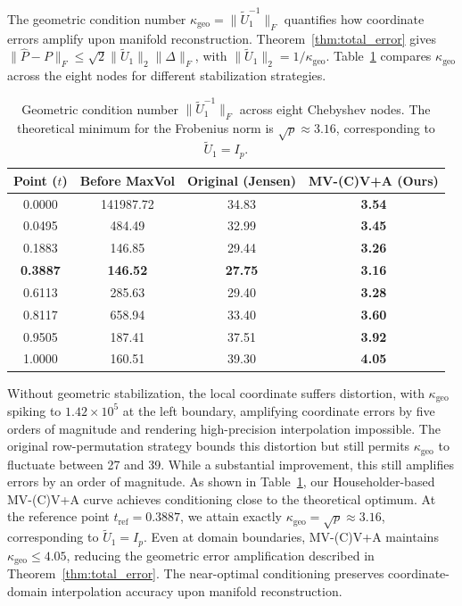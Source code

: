 \documentclass[11pt]{article}
\begin{document}
The geometric condition number $\kappa_{\text{geo}} = \|\widetilde U_1^{-1}\|_F$ quantifies how coordinate errors amplify upon manifold reconstruction. Theorem~\ref{thm:total_error} gives $\|\hat P - P\|_F \leq \sqrt{2} \|\widetilde U_1\|_2 \|\Delta\|_F$, with $\|\widetilde U_1\|_2 = 1/\kappa_{\text{geo}}$. Table~\ref{tab:geom_cond} compares $\kappa_{\text{geo}}$ across the eight nodes for different stabilization strategies.

\begin{table}[htbp]
\centering
\caption{Geometric condition number $\|\widetilde U_1^{-1}\|_F$ across eight Chebyshev nodes. The theoretical minimum for the Frobenius norm is $\sqrt{p} \approx 3.16$, corresponding to $\widetilde U_1 = I_p$.}
\label{tab:geom_cond}
\begin{tabular}{c|c|c|c}
\hline
\textbf{Point ($t$)} & \textbf{Before MaxVol} & \textbf{Original (Jensen)} & \textbf{ MV-(C)V+A (Ours)} \\
\hline
0.0000 & 141987.72 & 34.83 & \textbf{3.54} \\
0.0495 & 484.49 & 32.99 & \textbf{3.45} \\
0.1883 & 146.85 & 29.44 & \textbf{3.26} \\
{\bf 0.3887} & {\bf 146.52} & {\bf27.75} & \textbf{3.16} \\
0.6113 & 285.63 & 29.40 & \textbf{3.28} \\
0.8117 & 658.94 & 33.40 & \textbf{3.60} \\
0.9505 & 187.41 & 37.51 & \textbf{3.92} \\
1.0000 & 160.51 & 39.30 & \textbf{4.05} \\
\hline
\end{tabular}
\end{table}

Without geometric stabilization, the local coordinate suffers distortion, with $\kappa_{\text{geo}}$ spiking to $1.42\times10^5$ at the left boundary, amplifying coordinate errors by five orders of magnitude and rendering high-precision interpolation impossible.
The original row-permutation strategy bounds this distortion but still permits $\kappa_{\text{geo}}$ to fluctuate between 27 and 39. While a substantial improvement, this still amplifies errors by an order of magnitude.
As shown in Table~\ref{tab:geom_cond}, our Householder-based MV-(C)V+A curve achieves conditioning close to the theoretical optimum. At the reference point $t_{\text{ref}}=0.3887$, we attain exactly $\kappa_{\text{geo}} = \sqrt{p} \approx 3.16$, corresponding to $\widetilde U_1 = I_p$. Even at domain boundaries, MV-(C)V+A maintains $\kappa_{\text{geo}} \leq 4.05$, reducing the geometric error amplification described in Theorem~\ref{thm:total_error}. The near-optimal conditioning preserves coordinate-domain interpolation accuracy upon manifold reconstruction.
\end{document}
